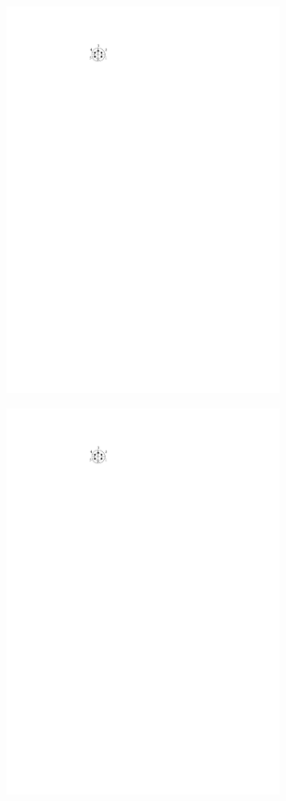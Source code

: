\begin{figure}
\centering
\begin{minipage}{0.5\textwidth}
\centering
		\includegraphics[width=0.8\textwidth]{images/Polbelegung_Buchse.pdf}
	\label{fig.polbuchse}
\end{minipage}%
\begin{minipage}{0.5\textwidth}
\centering
		\includegraphics[width=0.8\textwidth]{images/Polbelegung_Stecker.pdf}

\end{minipage}
\end{figure}
